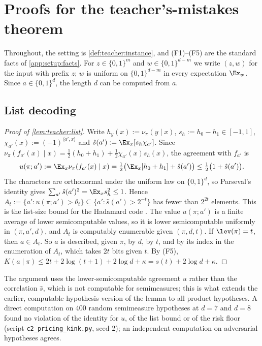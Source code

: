 \section{Proofs for the teacher's-mistakes theorem}\label{app:teacher}

Throughout, the setting is \cref{def:teacher:instance}, and (F1)--(F5) are the standard facts of \cref{app:setup:facts}. For $z\in\{0,1\}^m$ and $w\in\{0,1\}^{d-m}$ we write $(z,w)$ for the input with prefix $z$; $w$ is uniform on $\{0,1\}^{d-m}$ in every expectation $\Ex_w$. Since $a\in\{0,1\}^d$, the length $d$ can be computed from $a$.

\subsection{List decoding}\label{app:teacher:list}

\begin{proof}[Proof of \cref{lem:teacher:list}]
Write $h_y(x):=\nu_\pi(y\mid x)$, $s_h:=h_0-h_1\in[-1,1]$, $\chi_{a'}(x):=(-1)^{\langle a',x\rangle}$ and $\hat s(a'):=\Ex_x[s_h\chi_{a'}]$. Since $\nu_\pi(f_{a'}(x)\mid x)=\frac12(h_0+h_1)+\frac12\chi_{a'}(x)s_h(x)$, the agreement with $f_{a'}$ is
\[
u(\pi;a'):=\Ex_x\nu_\pi(f_{a'}(x)\mid x)=\tfrac12\big(\Ex_x[h_0+h_1]+\hat s(a')\big)\le\tfrac12\big(1+\hat s(a')\big).
\]
The characters are orthonormal under the uniform law on $\{0,1\}^d$, so Parseval's identity gives $\sum_{a'}\hat s(a')^2=\Ex_xs_h^2\le1$. Hence $A_t:=\{a':u(\pi;a')>\theta_t\}\subseteq\{a':\hat s(a')>2^{-t}\}$ has fewer than $2^{2t}$ elements. This is the list-size bound for the Hadamard code \citep{goldreich1989hard,kushilevitz1993learning}. The value $u(\pi;a')$ is a finite average of lower semicomputable values, so it is lower semicomputable uniformly in $(\pi,a',d)$, and $A_t$ is computably enumerable given $(\pi,d,t)$. If $\lev(\pi)=t$, then $a\in A_t$. So $a$ is described, given $\pi$, by $d$, by $t$, and by its index in the enumeration of $A_t$, which takes $2t$ bits given $t$. By (F5), $K(a\mid\pi)\le2t+2\log(t+1)+2\log d+\kappa=s(t)+2\log d+\kappa$.
\end{proof}

The argument uses the lower-semicomputable agreement $u$ rather than the correlation $\hat s$, which is not computable for semimeasures; this is what extends the earlier, computable-hypothesis version of the lemma \citep[section ``Simplicity and normativity from imitation'']{claude2026whatfollows} to all product hypotheses. A direct computation on $400$ random semimeasure hypotheses at $d=7$ and $d=8$ found no violation of the identity for $u$, of the list bound or of the risk floor (script \texttt{c2\_\allowbreak{}pricing\_\allowbreak{}kink.py}, seed 2); an independent computation on adversarial hypotheses agrees.

